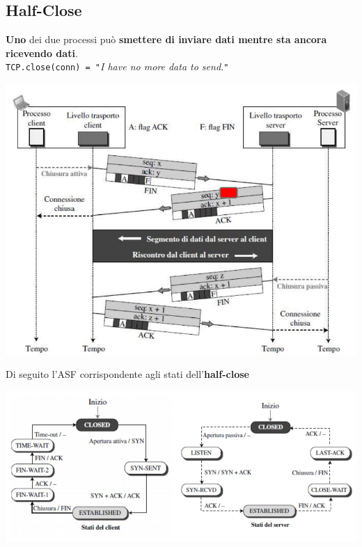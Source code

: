 \documentclass[10pt]{article}
\begin{document}
\subsection{Half-Close}
\textbf{Uno} dei due processi può \textbf{smettere di inviare dati mentre sta ancora ricevendo dati}.\\
\texttt{TCP.close(conn) = "}\textit{I have no more data to send.}\texttt{"}
\begin{center}
\includegraphics[scale=0.8]{halfclose.png}
\end{center}
Di seguito l'ASF corrispondente agli stati dell'\textbf{half-close}
\begin{center}
\includegraphics[scale=0.7]{halfcloseasf.png}
\end{center}
\end{document}
